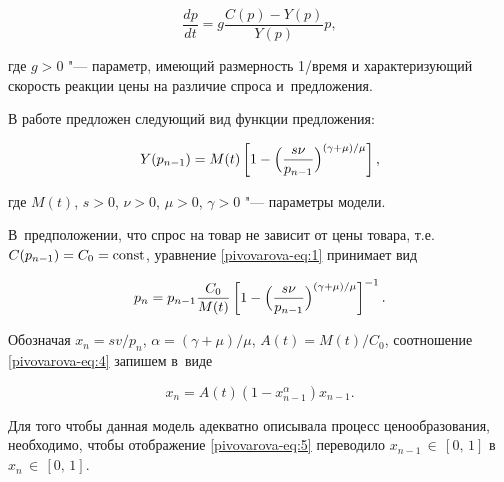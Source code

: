 \begin{equation}  

\frac{dp}{dt} =g\frac{C(p)-Y(p)}{Y(p)} p, 

\label{pivovarova-eq:2}

\end{equation} 

где $g>0$ "--- параметр, имеющий размерность 1/время и характеризующий скорость реакции цены на различие спроса и~предложения.



В работе \cite{pivovarova:5} предложен следующий вид функции предложения:

\begin{equation} 

Y(p_{n-1} )=M(t)\left[1-\Bigl(\frac{s\nu }{p_{n-1} } \Bigr)^{(\gamma +\mu )/\mu } \right]  ,

\label{pivovarova-eq:3}

\end{equation} 

где $M(t)$, $s>0$, $\nu >0$, $\mu >0$, $\gamma >0$ "--- параметры модели. 

В~предположении, что спрос на товар не зависит от цены товара, т.е. $C(p_{n-1} )=C_0=\rm const$, уравнение \eqref{pivovarova-eq:1} принимает вид

\begin{equation}  

p_{n} =p_{n-1} \frac{C_0}{M(t)}\left[1-\Bigl(\frac{s\nu }{p_{n-1} } \Bigl)^{(\gamma +\mu )/\mu } \right]^{-1} .

\label{pivovarova-eq:4}

\end{equation} 

Обозначая $x_{n} ={sv}/{p_{n} }$, $\alpha =({\gamma +\mu })/{\mu }$,  $A(t)={M(t)}/{C_0}$, соотношение \eqref{pivovarova-eq:4}  запишем в~виде

\begin{equation}  

x_{n} =A(t) (1-x_{n-1}^{\alpha } )x_{n-1} .

\label{pivovarova-eq:5}

\end{equation} 



Для того чтобы данная модель адекватно описывала процесс ценообразования, необходимо, чтобы отображение \eqref{pivovarova-eq:5} переводило $x_{n-1}\, {\in}\, [0,\, 1]$ в~\mbox{$x_{n} \,{\in}\, [0,\, 1]$. }

